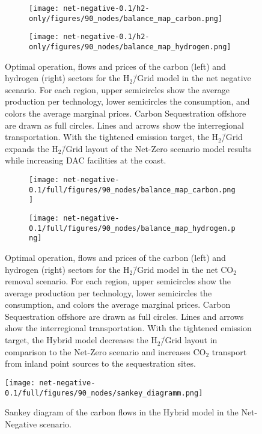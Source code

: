 \documentclass[twocolumn]{article}
\newcommand{\carbon}{CO$_2$}
\newcommand{\hydrogengrid}{H$_2$\=/Grid}
\newcommand{\hydrogenmodel}{H$_2$\=/Grid model}
\newcommand{\hybridmodel}{Hybrid model}
\begin{document}
\begin{figure}[ht!]
    \centering
    \begin{subfigure}{.5\textwidth}
        \centering
        \texttt{[image: net-negative-0.1/h2-only/figures/90\_nodes/balance\_map\_carbon.png]}
        \label{fig:balance_map_carbon_h2_nn}
    \end{subfigure}%
    \begin{subfigure}{.5\textwidth}
        \centering
        \texttt{[image: net-negative-0.1/h2-only/figures/90\_nodes/balance\_map\_hydrogen.png]}
        \label{fig:balance_map_hydrogen_h2_nn}
    \end{subfigure}
    \caption{Optimal operation, flows and prices of the carbon (left) and hydrogen (right) sectors for the \hydrogenmodel{} in the net negative scenario. For each region, upper semicircles show the average production per technology, lower semicircles the consumption, and colors the average marginal prices. Carbon Sequestration offshore are drawn as full circles. Lines and arrows show the interregional transportation. With the tightened emission target, the \hydrogengrid{} expands the \hydrogengrid{} layout of the Net-Zero scenario model results while increasing DAC facilities at the coast.
    }
    \label{fig:balance_maps_h2_nn}
\end{figure}


\begin{figure}[ht!]
    \centering
    \begin{subfigure}{.5\textwidth}
        \centering
        \texttt{[image: net-negative-0.1/full/figures/90\_nodes/balance\_map\_carbon.png]}
        \label{fig:balance_map_carbon_full_nn}
    \end{subfigure}%
    \begin{subfigure}{.5\textwidth}
        \centering
        \texttt{[image: net-negative-0.1/full/figures/90\_nodes/balance\_map\_hydrogen.png]}
        \label{fig:balance_map_hydrogen_full_nn}
    \end{subfigure}
    \caption{Optimal operation, flows and prices of the carbon (left) and hydrogen (right) sectors for the \hydrogenmodel{} in the net \carbon{} removal scenario. For each region, upper semicircles show the average production per technology, lower semicircles the consumption, and colors the average marginal prices. Carbon Sequestration offshore are drawn as full circles. Lines and arrows show the interregional transportation. With the tightened emission target, the \hybridmodel{} decreases the \hydrogengrid{} layout in comparison to the Net-Zero scenario and increases \carbon{} transport from inland point sources to the sequestration sites.
    }
    \label{fig:balance_maps_full_nn}
\end{figure}


\begin{figure}
    \centering
    \texttt{[image: net-negative-0.1/full/figures/90\_nodes/sankey\_diagramm.png]}
    \caption{Sankey diagram of the carbon flows in the \hybridmodel{} in the Net-Negative scenario.}
    \label{fig:sankey_diagramm}
\end{figure}
\end{document}
